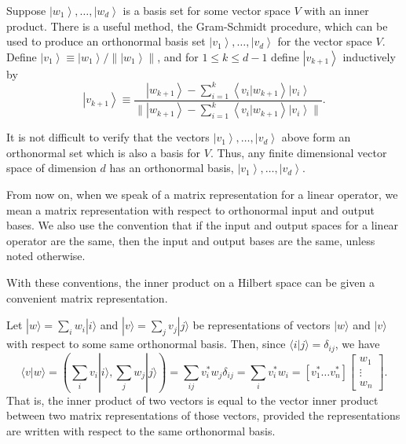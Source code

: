 \begin{proposition}
    Suppose $\left|w_{1}\right\rangle, \ldots,\left|w_{d}\right\rangle$ is a basis set for some vector space $V$ with an inner product. There is a useful method, the Gram-Schmidt procedure, which can be used to produce an orthonormal basis set $\left|v_{1}\right\rangle, \ldots,\left|v_{d}\right\rangle$ for the vector space $V$. Define $\left|v_{1}\right\rangle \equiv\left|w_{1}\right\rangle / \|\left|w_{1}\right\rangle \|$, and for $1 \leq k \leq d-1$ define $\left|v_{k+1}\right\rangle$ inductively by
\begin{equation}
    \left|v_{k+1}\right\rangle \equiv \frac{\left|w_{k+1}\right\rangle-\sum_{i=1}^{k}\left\langle v_{i} | w_{k+1}\right\rangle\left|v_{i}\right\rangle}{\|\left|w_{k+1}\right\rangle-\sum_{i=1}^{k}\left\langle v_{i} | w_{k+1}\right\rangle\left|v_{i}\right\rangle \|}.
\end{equation}
\end{proposition}

It is not difficult to verify that the vectors $\left|v_{1}\right\rangle, \ldots,\left|v_{d}\right\rangle$ above form an orthonormal set which is also a basis for $V$. Thus, any finite dimensional vector space of dimension $d$ has an orthonormal basis, $\left|v_{1}\right\rangle, \ldots,\left|v_{d}\right\rangle$.


\begin{remark}
    From now on, when we speak of a matrix representation for a linear operator, we mean a matrix representation with respect to orthonormal input and output bases. We also use the convention that if the input and output spaces for a linear operator are the same, then the input and output bases are the same, unless noted otherwise.
\end{remark}

With these conventions, the inner product on a Hilbert space can be given a convenient matrix representation. 

Let $|w\rangle=\sum_{i} w_{i}|i\rangle$ and $|v\rangle=\sum_{j} v_{j}|j\rangle$ be representations of vectors $|w\rangle$ and $|v\rangle$ with respect to some same orthonormal basis. Then, since $\langle i | j\rangle=\delta_{i j}$, we have
\begin{equation}
    \langle v | w\rangle 
=\left(\sum_{i} v_{i}|i\rangle, \sum_{j} w_{j}|j\rangle\right)=\sum_{i j} v_{i}^{*} w_{j} \delta_{i j}
=\sum_{i} v_{i}^{*} w_{i}
=\left[v_{1}^{*} \ldots v_{n}^{*}\right]\left[\begin{array}{c}
w_{1} \\
\vdots \\
w_{n}
\end{array}\right].
\end{equation}
That is, the inner product of two vectors is equal to the vector inner product between two matrix representations of those vectors, provided the representations are written with respect to the same orthonormal basis. 

